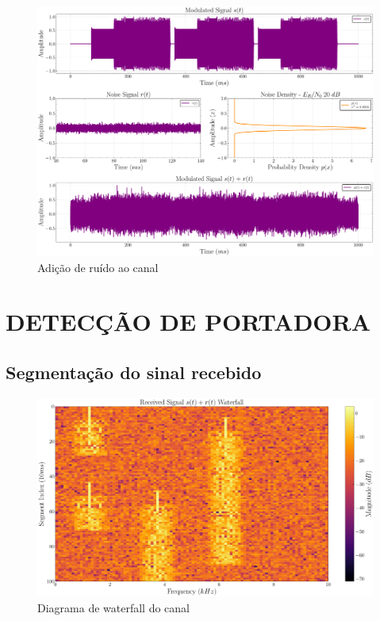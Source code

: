 \begin{figure}[H]
	\centering
	\caption{Adição de ruído ao canal}\label{fig:add_noise_time}
	\includegraphics[width=\linewidth]{assets/cap3/example_channel_time_channel.pdf}
\end{figure}

\section{DETECÇÃO DE PORTADORA}\label{sec:detector}

\subsection{Segmentação do sinal recebido}\label{sec:segmentacao}

\begin{figure}[H]
	\centering
	\caption{Diagrama de waterfall do canal}\label{fig:waterfall}
	\includegraphics[width=\linewidth]{assets/cap3/example_detector_waterfall.pdf}
\end{figure}


